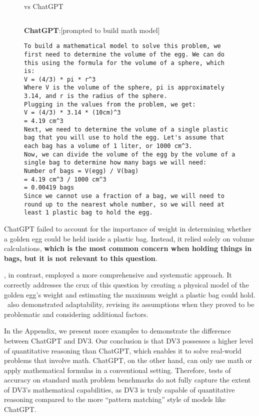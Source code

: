 \begin{figure}[H]
\begin{AIbox}{\DV vs ChatGPT}
\begin{verbatim}
\end{verbatim}
{\bf ChatGPT}:[prompted to build math model]
\begin{verbatim}
To build a mathematical model to solve this problem, we first need to determine the volume of the egg. We can do this using the formula for the volume of a sphere, which is:
V = (4/3) * pi * r^3
Where V is the volume of the sphere, pi is approximately 3.14, and r is the radius of the sphere.
Plugging in the values from the problem, we get:
V = (4/3) * 3.14 * (10cm)^3
= 4.19 cm^3
Next, we need to determine the volume of a single plastic bag that you will use to hold the egg. Let's assume that each bag has a volume of 1 liter, or 1000 cm^3.
Now, we can divide the volume of the egg by the volume of a single bag to determine how many bags we will need:
Number of bags = V(egg) / V(bag)
= 4.19 cm^3 / 1000 cm^3
= 0.00419 bags
Since we cannot use a fraction of a bag, we will need to round up to the nearest whole number, so we will need at least 1 plastic bag to hold the egg.
\end{verbatim}
\end{AIbox}
\end{figure}
ChatGPT failed to account for the importance of weight in determining whether a golden egg could be held inside a plastic bag. Instead, it relied solely on volume calculations, \textbf{which is the most common concern when holding things in bags, but it is not relevant to this question}.

\DV, in contrast, employed a more comprehensive and systematic approach. It correctly addresses the crux of this question by creating a physical model of the golden egg's weight and estimating the maximum weight a plastic bag could hold. \DV \ also demonstrated adaptability, revising its assumptions when they proved to be problematic and considering additional factors.





In the Appendix, we present more examples to demonstrate the difference between ChatGPT and DV3. Our conclusion is that DV3 possesses a higher level of quantitative reasoning than ChatGPT, which enables it to solve real-world problems that involve math. ChatGPT, on the other hand, can only use math or apply mathematical formulas in a conventional setting. Therefore, tests of accuracy on standard math problem benchmarks do not fully capture the extent of DV3's mathematical capabilities, as DV3 is truly capable of quantitative reasoning compared to the more ``pattern matching'' style of models like ChatGPT.

